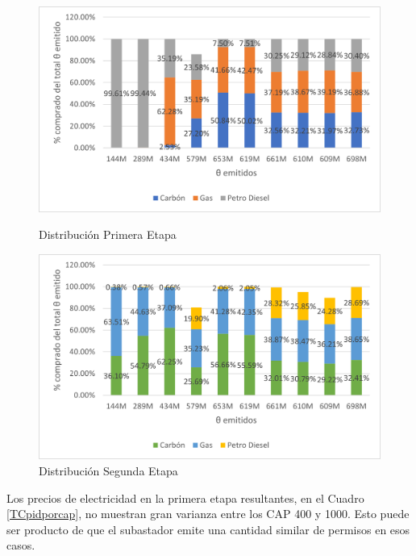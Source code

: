 \begin{figure}[H]
  \centering
  \begin{minipage}[b]{0.49\textwidth}
    \includegraphics[width=\textwidth]{docs/DocumentoMemoria/core/images/distr primera etapa tasa cuadrada.png}
    \caption{{\footnotesize Distribución Primera Etapa}}
    \label{comptc1}
  \end{minipage}
  \hfill
  \begin{minipage}[b]{0.49\textwidth}
    \includegraphics[width=\textwidth]{docs/DocumentoMemoria/core/images/distr segunda etapa tasa cuadrada.png}
    \caption{{\footnotesize Distribución Segunda Etapa}}
    \label{comptc2}
  \end{minipage}
\end{figure}

Los precios de electricidad en la primera etapa resultantes, en el Cuadro \ref{TCpidporcap}, no muestran gran varianza entre los CAP 400 y 1000. Esto puede ser producto de que el subastador emite una cantidad similar de permisos en esos casos.
\vspace{2.5mm}

